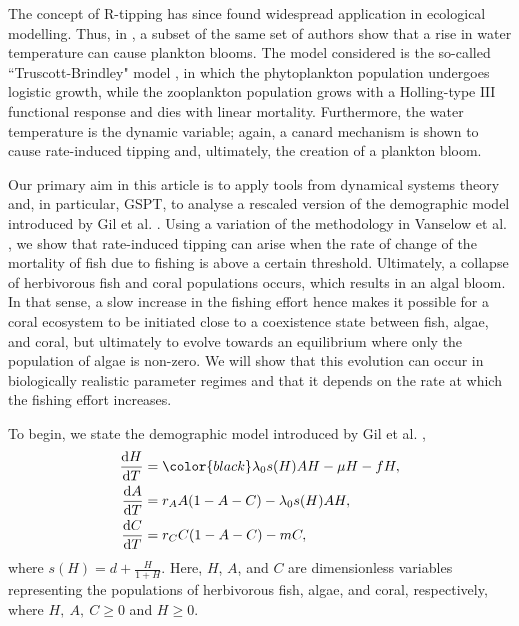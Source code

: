 \documentclass{article}
\theoremstyle{definition}
\numberwithin{equation}{section}
\newcommand{\dd}{\mathrm{d}}
\begin{document}
The concept of R-tipping has since found widespread application in ecological modelling. Thus, in \cite{Plankton-tipping}, a subset of the same set of authors show that a rise in water temperature can cause plankton blooms. The model considered is the so-called ``Truscott-Brindley" model \cite{TRUSCOTT1994981}, in which the phytoplankton population undergoes logistic growth, while the zooplankton population grows with a Holling-type $\mathrm{III}$ functional response and dies with linear mortality. Furthermore, the water temperature is the dynamic variable; again, a canard mechanism is shown to cause rate-induced tipping and, ultimately, the creation of a plankton bloom.

Our primary aim in this article is to apply tools from dynamical systems theory and, in particular, GSPT, to analyse a rescaled version of the demographic model introduced by Gil et al. \cite{gil2020}. Using a variation of the methodology in Vanselow et al. \cite{Plankton-tipping,vanselow_2019_when}, we show that rate-induced tipping can arise when the rate of change of the mortality of fish due to fishing is above a certain threshold.
Ultimately, a collapse of herbivorous fish and coral populations occurs, which results in an algal bloom. In that sense, a slow increase in the fishing effort hence makes it possible for a coral ecosystem to be initiated close to a coexistence state between fish, algae, and coral, but ultimately to evolve towards an equilibrium where only the population of algae is non-zero. We will show that this evolution can occur in biologically realistic parameter regimes and that it depends on the rate at which the fishing effort increases.

To begin, we state the demographic model introduced by Gil et al. \cite{gil2020},
\begin{equation}
    \begin{aligned}
    \frac{\dd H}{\dd T}&={\color{black}\lambda_0} s(H)AH - \mu H - fH, \\
    \frac{\dd A}{\dd T} &=r_{A}A(1-A-C)-\lambda_0 s(H)AH, \\
    \frac{\dd C}{\dd T} &=r_CC(1-A-C)-mC,
    \label{PNAS Model}
    \end{aligned}
\end{equation}
where $s(H)=d+\frac{H}{1+H}$. Here, $H$, $A$, and $C$ are dimensionless variables representing the populations of herbivorous fish, algae, and coral, respectively, where $H,\ A,\ C\geq 0$ and $H\geq 0$. 
\end{document}
